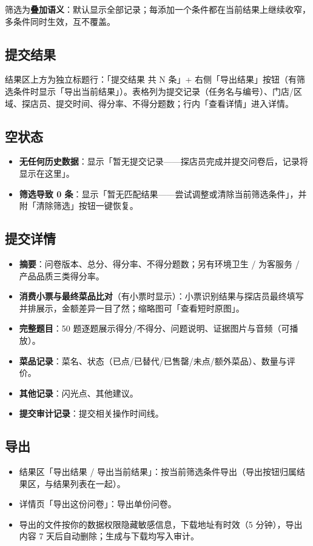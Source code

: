 \documentclass[12pt,a4paper,fontset=none]{ctexart}
\begin{document}
筛选为\textbf{叠加语义}：默认显示全部记录；每添加一个条件都在当前结果上继续收窄，多条件同时生效，互不覆盖。

\subsection{提交结果}
结果区上方为独立标题行：「提交结果 共 N 条」+ 右侧「导出结果」按钮（有筛选条件时显示「导出当前结果」）。表格列为提交记录（任务名与编号）、门店/区域、探店员、提交时间、得分率、不得分题数；行内「查看详情」进入详情。

\subsection{空状态}
\begin{itemize}
\item \textbf{无任何历史数据}：显示「暂无提交记录——探店员完成并提交问卷后，记录将显示在这里」。
\item \textbf{筛选导致 0 条}：显示「暂无匹配结果——尝试调整或清除当前筛选条件」，并附「清除筛选」按钮一键恢复。
\end{itemize}

\subsection{提交详情}
\begin{itemize}
\item \textbf{摘要}：问卷版本、总分、得分率、不得分题数；另有环境卫生 / 为客服务 / 产品品质三类得分率。
\item \textbf{消费小票与最终菜品比对}（有小票时显示）：小票识别结果与探店员最终填写并排展示，金额差异一目了然；缩略图可「查看短时原图」。
\item \textbf{完整题目}：50 题逐题展示得分/不得分、问题说明、证据图片与音频（可播放）。
\item \textbf{菜品记录}：菜名、状态（已点/已替代/已售罄/未点/额外菜品）、数量与评价。
\item \textbf{其他记录}：闪光点、其他建议。
\item \textbf{提交审计记录}：提交相关操作时间线。
\end{itemize}

\subsection{导出}
\begin{itemize}
\item 结果区「导出结果 / 导出当前结果」：按当前筛选条件导出（导出按钮归属结果区，与结果列表在一起）。
\item 详情页「导出这份问卷」：导出单份问卷。
\item 导出的文件按你的数据权限隐藏敏感信息，下载地址有时效（5 分钟），导出内容 7 天后自动删除；生成与下载均写入审计。
\end{itemize}
\end{document}
